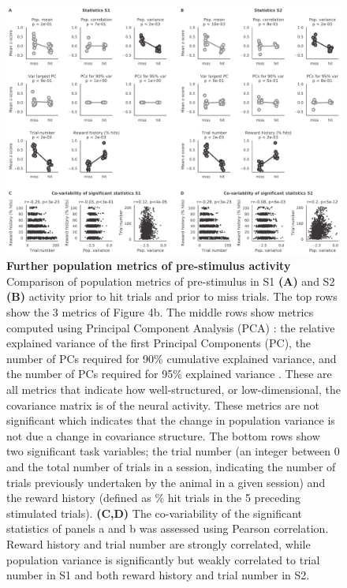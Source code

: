 \begin{figure}[h!]
\vspace*{-1.5cm}
\hspace*{-0.6in}
\includegraphics[scale=0.48]{figures/supplements/Supplementary_Figure6.pdf}
\caption[\textbf{Further population metrics of pre-stimulus activity
}]{\textbf{Further population metrics of pre-stimulus activity
} 
Comparison of population metrics of pre-stimulus in  S1 \textbf{(A)} and S2 \textbf{(B)} activity prior to hit trials and prior to miss trials. The top rows show the 3 metrics of Figure 4b. The middle rows show metrics computed using Principal Component Analysis (PCA) \cite{cunningham_dimensionality_2014}: the relative explained variance of the first Principal Components (PC), the number of PCs required for 90\% cumulative explained variance, and the number of PCs required for 95\% explained variance \cite{williamson_scaling_2016}. These are all metrics that indicate how well-structured, or low-dimensional, the covariance matrix is of the neural activity. These metrics are not significant which indicates that the change in population variance is not due a change in covariance structure. The bottom rows show two significant task variables; the trial number (an integer between 0 and the total number of trials in a session, indicating the number of trials previously undertaken by the animal in a given session) and the reward history (defined as \% hit trials in the 5 preceding stimulated trials). \textbf{(C,D)} The co-variability of the significant statistics of panels a and b was assessed using Pearson correlation. Reward history and trial number are strongly correlated, while population variance is significantly but weakly correlated to trial number in S1 and both reward history and trial number in S2. 
} 
\label{fig:supp6}
\end{figure}


